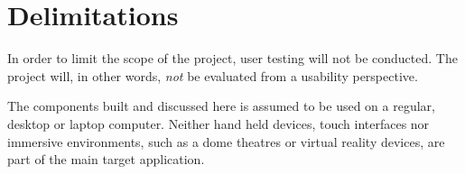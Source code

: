 

\section{Delimitations}
\label{sec:delimitations}


In order to limit the scope of the project, user testing will not be conducted. The project will, in other words, \emph{not} be evaluated from a usability perspective.

The components built and discussed here is assumed to be used on a regular, desktop or laptop computer. Neither hand held devices, touch interfaces nor immersive environments, such as a dome theatres or virtual reality devices, are part of the main target application.




